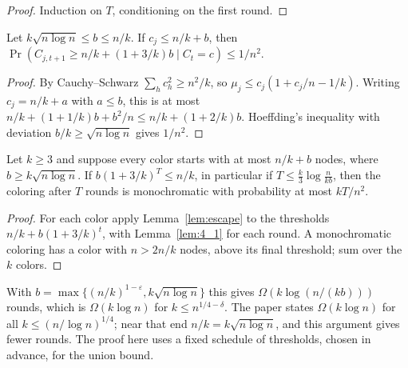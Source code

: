 \begin{proof}
  \leanok
  Induction on $T$, conditioning on the first round.
\end{proof}

\begin{lemma}[Lemma 4.1]\label{lem:4_1}
  \leanok
  Let $k\sqrt{n\log n} \le b \le n/k$. If $c_j \le n/k + b$, then
  $\Pr(C_{j,t+1} \ge n/k + (1 + 3/k)b \mid C_t = c) \le 1/n^2$.
\end{lemma}

\begin{proof}
  \leanok
  By Cauchy--Schwarz $\sum_h c_h^2 \ge n^2/k$, so
  $\mu_j \le c_j(1 + c_j/n - 1/k)$. Writing $c_j = n/k + a$ with $a \le b$,
  this is at most $n/k + (1+1/k)b + b^2/n \le n/k + (1+2/k)b$. Hoeffding's
  inequality with deviation $b/k \ge \sqrt{n\log n}$ gives $1/n^2$.
\end{proof}

\begin{theorem}\label{thm:4_2}
  \leanok
  Let $k \ge 3$ and suppose every color starts with at most $n/k + b$ nodes,
  where $b \ge k\sqrt{n\log n}$. If $b(1 + 3/k)^T \le n/k$, in particular if
  $T \le \frac k3 \log\frac{n}{kb}$, then the coloring after $T$ rounds is
  monochromatic with probability at most $kT/n^2$.
\end{theorem}

\begin{proof}
  \leanok
  For each color apply Lemma~\ref{lem:escape} to the thresholds
  $n/k + b(1+3/k)^t$, with Lemma~\ref{lem:4_1} for each round. A
  monochromatic coloring has a color with $n > 2n/k$ nodes, above its final
  threshold; sum over the $k$ colors.
\end{proof}

\begin{remark}
  With $b = \max\{(n/k)^{1-\varepsilon}, k\sqrt{n\log n}\}$ this gives
  $\Omega(k\log(n/(kb)))$ rounds, which is $\Omega(k\log n)$ for
  $k \le n^{1/4-\delta}$. The paper states $\Omega(k\log n)$ for all
  $k \le (n/\log n)^{1/4}$; near that end $n/k = k\sqrt{n\log n}$, and this
  argument gives fewer rounds. The proof here uses a fixed schedule of
  thresholds, chosen in advance, for the union bound.
\end{remark}

